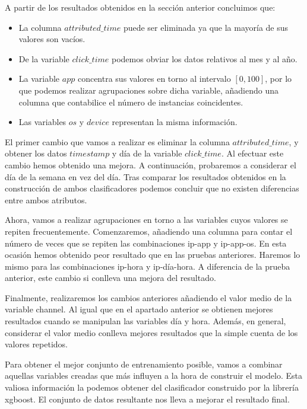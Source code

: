 A partir de los resultados obtenidos en la sección anterior concluimos que:

\begin{itemize}
	\item La columna $attributed\_time$ puede ser eliminada ya que la mayoría de sus valores son vacíos.
	\item De la variable $click\_time$ podemos obviar los datos relativos al mes y al año.
	\item La variable $app$ concentra sus valores en torno al intervalo $[0,100]$, por lo que podemos realizar agrupaciones sobre dicha variable, añadiendo una columna que contabilice el número de instancias coincidentes.
	\item Las variables $os$ y $device$ representan la misma información.
\end{itemize}

El primer cambio que vamos a realizar es eliminar la columna $attributed\_time$, y obtener los datos $timestamp$ y día de la variable $click\_time$. Al efectuar este cambio hemos obtenido una mejora. A continuación, probaremos a considerar el día de la semana en vez del día. Tras comparar los resultados obtenidos en la construcción de ambos clasificadores podemos concluir que no existen diferencias entre ambos atributos.

\medskip

Ahora, vamos a realizar agrupaciones en torno a las variables cuyos valores se repiten frecuentemente. Comenzaremos, añadiendo una columna para contar el número de veces que se repiten las combinaciones ip-app y ip-app-os. En esta ocasión hemos obtenido peor resultado que en las pruebas anteriores. Haremos lo mismo para las combinaciones ip-hora y ip-día-hora. A diferencia de la prueba anterior, este cambio si conlleva una mejora del resultado.

Finalmente, realizaremos los cambios anteriores añadiendo el valor medio de la variable channel. Al igual que en el apartado anterior se obtienen mejores resultados cuando se manipulan las variables día y hora. Además, en general, considerar el valor medio conlleva mejores resultados que la simple cuenta de los valores repetidos.
\bigskip

Para obtener el mejor conjunto de entrenamiento posible, vamos a combinar aquellas variables creadas que más influyen a la hora de construir el modelo. Esta valiosa información la podemos obtener del clasificador construido por la librería xgboost. 
El conjunto de datos resultante nos lleva a mejorar el resultado final.

